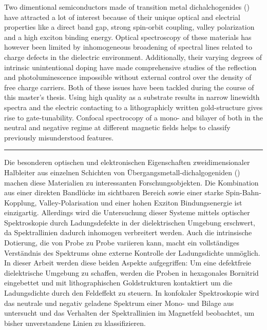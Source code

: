 
Two dimentional semiconductors made of transition metal dichalchogenides (\tmds\!) have attracted a lot of interest because of their unique optical and electrial properties like a direct band gap, strong spin-orbit coupling, valley polarization and a high exciton binding energy. Optical spectroscopy of these materials has however been limited by inhomogeneous broadening of spectral lines related to charge defects in the dielectric environment. Additionally, their varying degrees of intrinsic unintentional doping have made comprehensive studies of the reflection and photoluminescence impossible without external control over the density of free charge carriers. Both of these issues have been tackled during the course of this master's thesis. Using high quality \hbng as a substrate results in narrow linewidth \pl spectra and the electric contacting to a lithographicly written gold-structure gives rise to gate-tunability. Confocal spectrocopy of a mono- and bilayer of \wse both in the neutral and negative regime at different magnetic fields helps to classify previously misunderstood features.\newline
\begin{center}
\par\rule[8pt]{0.7\textwidth}{0.5pt}
\end{center}
Die besonderen optischen und elektronischen Eigenschaften zweidimensionaler Halbleiter aus einzelnen Schichten von Übergangsmetall-dichalgogeniden (\tmds\!) machen diese Materialien zu interessanten Forschungsobjekten. Die Kombination aus einer direkten Bandlücke im sichtbaren Bereich sowie einer starke Spin-Bahn-Kopplung, Valley-Polarisation und einer hohen Exziton Bindungsenergie ist einzigartig. Allerdings wird die Untersuchung dieser Systeme mittels optischer Spektroskopie durch Ladungsdefekte in der dielektrischen Umgebung erschwert, da Spektrallinien dadurch inhomogen verbreitert werden. Auch die intrinsische Dotierung, die von Probe zu Probe variieren kann, macht ein vollständiges Verständnis des Spektrums ohne externe Kontrolle der Ladungsdichte unmöglich. In dieser Arbeit werden diese beiden Aspekte aufgegriffen: Um eine defektfreie dielektrische Umgebung zu schaffen, werden die Proben in hexagonales Bornitrid eingebettet und mit lithographischen Goldstrukturen kontaktiert um die Ladungsdichte durch den Feldeffekt zu steuern. In konfokaler Spektroskopie wird das neutrale und negativ geladene Spektrum einer Mono- und Bilage aus \wse untersucht und das Verhalten der Spektrallinien im Magnetfeld beobachtet, um bisher unverstandene Linien zu klassifizieren.